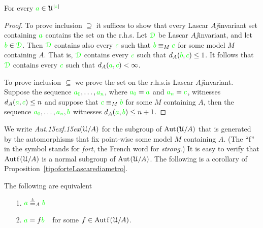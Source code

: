 \documentclass[creche.tex]{subfiles}
\begin{document}
\begin{proposition}\label{tipoforteLascarediametro} For every ${\color{green} a}\in\EuScript U^{|{\color{green} z}|}$

\end{proposition}


\begin{proof}
To prove inclusion $\supseteq$ it suffices to show that every Lascar $A\jj$invariant set containing ${\color{green} a}$ contains the set on the r.h.s. Let ${\color{green}\EuScript D}$ be Lascar $A\jj$invariant, and let ${\color{green} b}\in{\color{green}\EuScript D}$. Then ${\color{green}\EuScript D}$ contains also every ${\color{green} c}$ such that ${\color{green} b}\equiv_M{\color{green} c}$ for some model $M$ containing $A$. That is, ${\color{green}\EuScript D}$ contains every ${\color{green} c}$ such that $d_A({\color{green} b},{\color{green} c})\le 1$. It follows that ${\color{green}\EuScript D}$ contains every ${\color{green} c}$ such that $d_A({\color{green} a},{\color{green} c})<\infty$. 

To prove inclusion $\subseteq$ we prove the set on the r.h.s.\@ is Lascar $A\jj$invariant. Suppose the sequence ${\color{green} a_0},\dots,{\color{green} a_n}$, where ${\color{green} a_0}={\color{green} a}$ and ${\color{green} a_n}={\color{green} c}$, witnesses $d_A({\color{green} a},{\color{green} c})\le n$ and suppose that ${\color{green} c}\equiv_M{\color{green} b}$ for some $M$ containing $A$, then the sequence ${\color{green} a_0},\dots,{\color{green} a_n},{\color{green} b}$ witnesses $d_A({\color{green} a},{\color{green} b})\le n+1$.
\end{proof}

We write \emph{Aut\kern.15ex{f}\kern.15ex$(\EuScript U/A)$\/} for the subgroup of $\textrm{Aut\kern.15ex}(\EuScript U/A)$ that is generated by the automorphisms that fix point-wise some model $M$ containing $A$. (The ``f'' in the symbol stands for \textit{fort\/}, the French word for \textit{strong}.) It is easy to verify that $\mathord{\rm Aut\kern.15ex{f}\kern.15ex}(\EuScript U/A)$ is a normal subgroup of $\textrm{Aut\kern.15ex}(\EuScript U/A)$. The following is a corollary of Proposition~\ref{tipoforteLascarediametro}. 

\begin{corollary}
The following are equivalent
\begin{itemize}
 \item[1.] ${\gr a}\equivL_A{\gr b}$
 \item[2.] ${\color{green} a}=f{\color{green} b}$\ \ for some $f\in\mathord{\rm Aut\kern.15ex{f}\kern.15ex}(\EuScript U/A)$.\QED
\end{itemize}
\end{corollary}

% 
\end{document}
